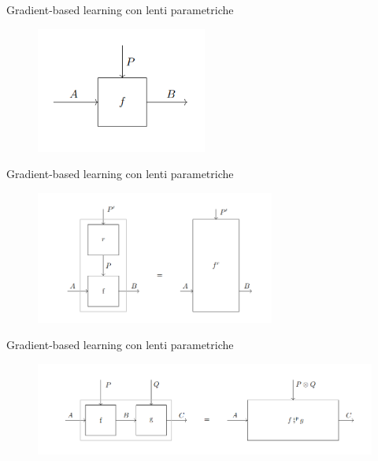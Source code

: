 \documentclass{beamer}
\begin{document}
\begin{frame}{Gradient-based learning con lenti parametriche}
    \begin{figure}
        \begin{center}
            \includegraphics[width=0.5\textwidth]{figures/para.png}
            \caption*{\cite{gavranovic2024fundamental}}
        \end{center}
    \end{figure}
\end{frame}

\begin{frame}{Gradient-based learning con lenti parametriche}
    \begin{figure}
        \begin{center}
            \includegraphics[width=0.7\textwidth]{figures/para_reparametrization.png}
            \caption*{\cite{gavranovic2024fundamental}}
        \end{center}
    \end{figure}
\end{frame}

\begin{frame}{Gradient-based learning con lenti parametriche}
    \begin{figure}
        \begin{center}
            \includegraphics[width=\textwidth]{figures/para_composition.png}
            \caption*{\cite{gavranovic2024fundamental}}
        \end{center}
    \end{figure}
\end{frame}
\end{document}
